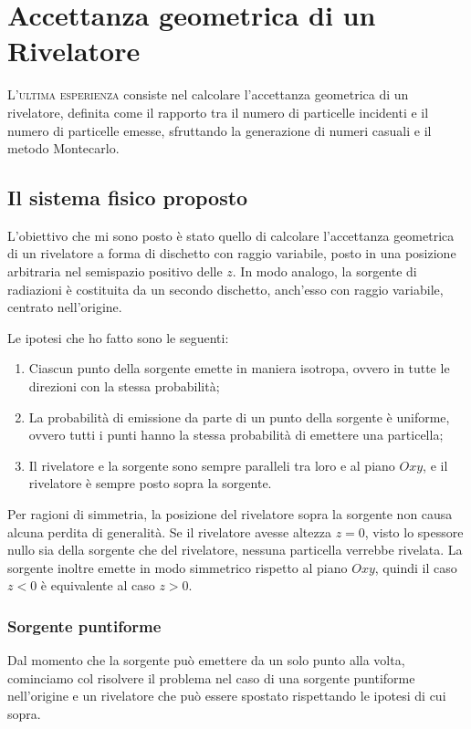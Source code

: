 \chapter{Accettanza geometrica di un Rivelatore}\label{ch:acc}
    \lettrine[loversize=0.08, lines=2]{L}{'ultima esperienza} consiste nel calcolare l'accettanza geometrica di un rivelatore, definita come il rapporto tra il numero di particelle incidenti e il numero di particelle emesse, sfruttando la generazione di numeri casuali e il metodo Montecarlo.

    \section{Il sistema fisico proposto}
        L'obiettivo che mi sono posto è stato quello di calcolare l'accettanza geometrica di un rivelatore a forma di dischetto con raggio variabile, posto in una posizione arbitraria nel semispazio positivo delle $z$. In modo analogo, la sorgente di radiazioni è costituita da un secondo dischetto, anch'esso con raggio variabile, centrato nell'origine.

        Le ipotesi che ho fatto sono le seguenti:
        \begin{enumerate}
            \item Ciascun punto della sorgente emette in maniera isotropa, ovvero in tutte le direzioni con la stessa probabilità;
            \item La probabilità di emissione da parte di un punto della sorgente è uniforme, ovvero tutti i punti hanno la stessa probabilità di emettere una particella;
            \item Il rivelatore e la sorgente sono sempre paralleli tra loro e al piano $Oxy$, e il rivelatore è sempre posto sopra la sorgente.
        \end{enumerate}

        Per ragioni di simmetria, la posizione del rivelatore sopra la sorgente non causa alcuna perdita di generalità. Se il rivelatore avesse altezza $z=0$, visto lo spessore nullo sia della sorgente che del rivelatore, nessuna particella verrebbe rivelata. La sorgente inoltre emette in modo simmetrico rispetto al piano $Oxy$, quindi il caso $z<0$ è equivalente al caso $z>0$.

        \subsection{Sorgente puntiforme}\label{ss:acc:sorgente-puntiforme}
            Dal momento che la sorgente può emettere da un solo punto alla volta, cominciamo col risolvere il problema nel caso di una sorgente puntiforme nell'origine e un rivelatore che può essere spostato rispettando le ipotesi di cui sopra. 
            
